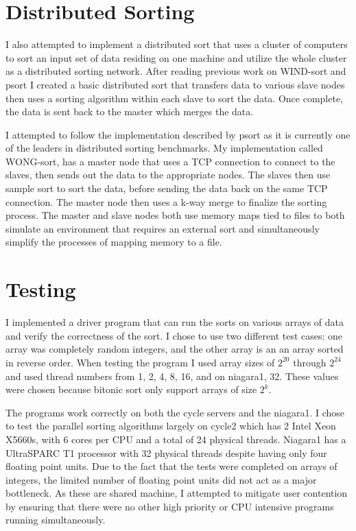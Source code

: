\documentclass[11pt,letterpaper]{article}
\begin{document}
\section{Distributed Sorting}
I also attempted to implement a distributed sort that uses a cluster of
computers to sort an input set of data residing on one machine and utilize the
whole cluster as a distributed sorting network.  After reading previous work on
WIND-sort \cite{data} and psort \cite{psort} I created a basic distributed sort
that transfers data to various slave nodes then uses a sorting algorithm within
each slave to sort the data. Once complete, the data is sent back to the master
which merges the data.
\par
I attempted to follow the implementation described by psort \cite{psort} as it
is currently one of the leaders in distributed sorting benchmarks.  My
implementation called WONG-sort, has a master node that uses a TCP connection
to connect to the slaves, then sends out the data to the appropriate nodes.
The slaves then use sample sort to sort the data, before sending the data back
on the same TCP connection.  The master node then uses a k-way merge to
finalize the sorting process.  The master and slave nodes both use memory maps
tied to files to both simulate an environment that requires an external sort
and simultaneously simplify the processes of mapping memory to a file.

\section{Testing} 
I implemented a driver program that can run the sorts on various arrays of data
and verify the correctness of the sort.  I chose to use two different test
cases: one array was completely random integers, and the other array is an an
array sorted in reverse order.  When testing the program I used array sizes of
$2^{20}$ through $2^{24}$ and used thread numbers from 1, 2, 4, 8, 16, and on niagara1, 32.  These values were chosen because bitonic sort only support arrays of size $2^k$.

The programs work correctly on both the cycle servers and the niagara1.  I
chose to test the parallel sorting algorithms largely on cycle2 which has 2
Intel Xeon X5660s, with 6 cores per CPU and a total of 24 physical threads.
Niagara1 has a UltraSPARC T1 processor with 32 physical threads despite having
only four floating point units.  Due to the fact that the tests were completed
on arrays of integers, the limited number of floating point units did not act
as a major bottleneck. As these are shared machine, I attempted to mitigate
user contention by ensuring that there were no other high priority or CPU
intensive programs running simultaneously.
\end{document}
